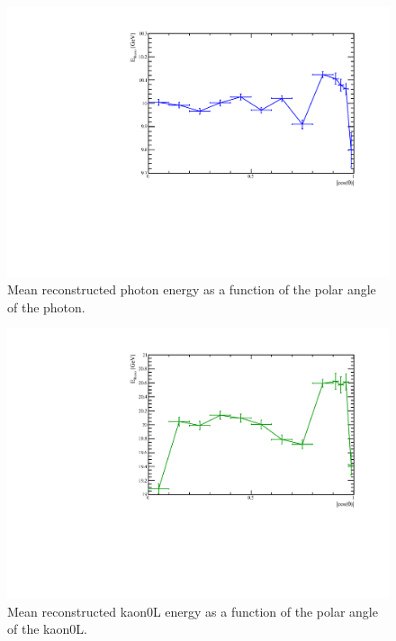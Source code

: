 
\begin{figure}
  \includegraphics[width=\largefigwidth]{EnergyEstimators/Plots/Calibration/Validation/AngularDistributionPhotonPlot.pdf}
  \caption[Mean reconstructed photon energy as a function of the polar angle of the photon.]{Mean reconstructed photon energy as a function of the polar angle of the photon.}
  \label{engest:fig:photonangle}
\end{figure}

\begin{figure}
  \includegraphics[width=\largefigwidth]{EnergyEstimators/Plots/Calibration/Validation/AngularDistributionKaon0LPlot.pdf}  \caption[Mean reconstructed kaon0L energy as a function of the polar angle of the kaon0L.]{Mean reconstructed kaon0L energy as a function of the polar angle of the kaon0L.}
    \label{engest:fig:photonangle}
    \end{figure}



